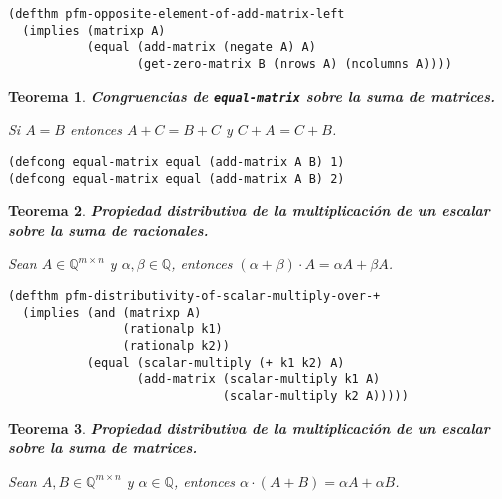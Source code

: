 \documentclass[a4paper,10pt]{article}
\newcommand{\Q}[1]{#1 \in \mathbb{Q}}
\newcommand{\M}[3]{#1 \in \mathbb{Q}^{#2 \times #3}}
\newtheorem{teor}{{Teorema}}
\begin{document}
\begin{lstlisting}[language=clips]
(defthm pfm-opposite-element-of-add-matrix-left
  (implies (matrixp A)
           (equal (add-matrix (negate A) A)
                  (get-zero-matrix B (nrows A) (ncolumns A))))
\end{lstlisting}	

\par \vspace{16pt}

\begin{teor} \textbf{Congruencias de \texttt{equal-matrix} sobre la suma de matrices.}\vspace{8pt}\par
Si $A=B$ entonces $A + C = B + C$ y $C + A = C + B$.
\end{teor}

\begin{lstlisting}[language=clips]
(defcong equal-matrix equal (add-matrix A B) 1)
(defcong equal-matrix equal (add-matrix A B) 2)
\end{lstlisting}	

\par \vspace{16pt}

\begin{teor} \textbf{Propiedad distributiva de la multiplicación de un escalar sobre la suma de racionales.}\vspace{8pt}\par
Sean $\M{A}{m}{n}$ y $\Q{\alpha,\beta}$, entonces $(\alpha + \beta)\cdot A = \alpha A + \beta A$.
\end{teor}

\begin{lstlisting}[language=clips]
(defthm pfm-distributivity-of-scalar-multiply-over-+
  (implies (and (matrixp A)
                (rationalp k1)
                (rationalp k2))
           (equal (scalar-multiply (+ k1 k2) A)
                  (add-matrix (scalar-multiply k1 A) 
                              (scalar-multiply k2 A)))))
\end{lstlisting}	

\par \vspace{16pt}

\begin{teor} \textbf{Propiedad distributiva de la multiplicación de un escalar sobre la suma de matrices.}\vspace{8pt}\par
Sean $\M{A,B}{m}{n}$ y $\Q{\alpha}$, entonces $\alpha \cdot (A + B) = \alpha A + \alpha B$.
\end{teor}
\end{document}

